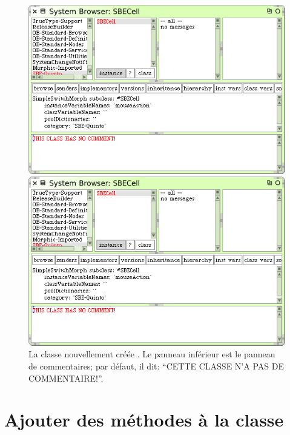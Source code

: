 \documentclass[a4paper,10pt,twoside]{book}
\begin{document}

\begin{figure}[h!t]
\ifluluelse
	{\centerline {\includegraphics[width=\textwidth]{SBECell}}}
	{\centerline {\includegraphics[scale=0.7]{SBECell}}}
\caption{La classe nouvellement créée . Le panneau
  inf\'erieur est le panneau de commentaires; par d\'efaut, il dit:
  ``CETTE CLASSE N'A PAS DE COMMENTAIRE!''.
\label{fig:SBECell}}
\end{figure}

\section{Ajouter des méthodes à la classe}
\end{document}
